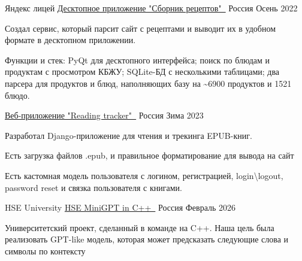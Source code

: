 

\begin{cventries}

\cventry
  {Яндекс лицей} %
  {\href{https://github.com/mistmake/Recipes_collection.git}{Десктопное приложение "Сборник рецептов"~\faGithubSquare}} %
  {Россия} %
  {Осень 2022} %
  {
    \begin{cvitems}
      \item {Создал сервис, который парсит сайт с рецептами и выводит их в удобном формате в десктопном приложении.}
      \item {Функции и стек: PyQt для десктопного интерфейса; поиск по блюдам и продуктам с просмотром КБЖУ; SQLite-БД с несколькими таблицами; два парсера для продуктов и блюд, наполняющих базу на \textasciitilde{}6900 продуктов и 1521 блюдо.}
    \end{cvitems}
  }
  \cventry
  {} %
  {\href{https://github.com/mistmake/Reading_tracker}{Веб-приложение "Reading tracker"~\faGithubSquare}}%
  {Россия} %
  {Зима 2023} %
  {
    \begin{cvitems}
      \item {Разработал Django-приложение для чтения и трекинга EPUB-книг.}
      \item {Есть загрузка файлов .epub, и правильное форматирование для вывода на сайт}
      \item {Есть кастомная модель пользователя с логином, регистрацией, login\textbackslash logout, password reset и связка пользователя с книгами.}
    \end{cvitems}
  }
  \cventry
  {HSE University} %
  {\href{https://github.com/mistmake/HSE-project-Mini-GPT-cpp.git}{HSE MiniGPT in C++~\faGithubSquare}} %
  {Россия} %
  {Февраль 2026} %
  {
    \begin{cvitems}
      \item {Университетский проект, сделанный в команде на C++. Наша цель была реализовать GPT-like модель, которая может предсказать следующие слова и символы по контексту}

\end{cvitems}}
\end{cventries}
